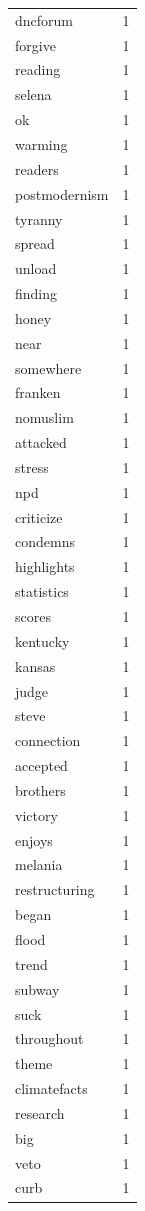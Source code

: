 \begin{tabular}{lr}
dncforum & 1 \\
forgive & 1 \\
reading & 1 \\
selena & 1 \\
ok & 1 \\
warming & 1 \\
readers & 1 \\
postmodernism & 1 \\
tyranny & 1 \\
spread & 1 \\
unload & 1 \\
finding & 1 \\
honey & 1 \\
near & 1 \\
somewhere & 1 \\
franken & 1 \\
nomuslim & 1 \\
attacked & 1 \\
stress & 1 \\
npd & 1 \\
criticize & 1 \\
condemns & 1 \\
highlights & 1 \\
statistics & 1 \\
scores & 1 \\
kentucky & 1 \\
kansas & 1 \\
judge & 1 \\
steve & 1 \\
connection & 1 \\
accepted & 1 \\
brothers & 1 \\
victory & 1 \\
enjoys & 1 \\
melania & 1 \\
restructuring & 1 \\
began & 1 \\
flood & 1 \\
trend & 1 \\
subway & 1 \\
suck & 1 \\
throughout & 1 \\
theme & 1 \\
climatefacts & 1 \\
research & 1 \\
big & 1 \\
veto & 1 \\
curb & 1 \\

\end{tabular}
